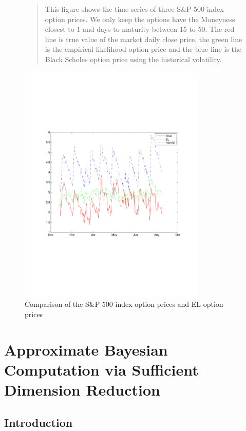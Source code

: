 \documentclass[oneside,english]{amsbook}
\numberwithin{section}{chapter}
\numberwithin{equation}{section}
\numberwithin{figure}{section}
\theoremstyle{plain}
\theoremstyle{plain}
\theoremstyle{definition}
\theoremstyle{plain}
\theoremstyle{plain}
\theoremstyle{remark}
\theoremstyle{definition}
\theoremstyle{definition}
\begin{document}
\newpage

\begin{figure}[t]
\centering \caption{Comparison of the S\&P 500 index option prices and EL option prices}

\begin{quote} %

This figure shows the time series of three S\&P 500 index option prices. We only keep the options have the Moneyness closest to 1 and days to maturity between 15 to 50. The red line is true value of the market daily close price, the green line is the empirical likelihood option price and the blue line is the Black Scholes option price using the historical volatility. 
\end{quote}
  \includegraphics[width=0.8\textwidth]{SP500.pdf}
\end{figure}


\chapter{Approximate Bayesian Computation via Sufficient Dimension Reduction}


\section{Introduction}
\end{document}
